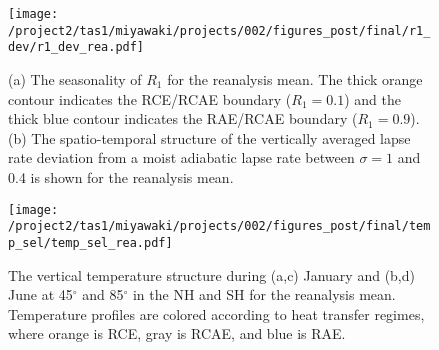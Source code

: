 \documentclass{ametsocV5}
\begin{document}

\begin{figure}[t]
  \noindent\texttt{[image: /project2/tas1/miyawaki/projects/002/figures\_post/final/r1\_dev/r1\_dev\_rea.pdf]}\\
  \caption{(a) The seasonality of $R_{1}$ for the reanalysis mean. The thick orange contour indicates the RCE/RCAE boundary ($R_1=0.1$) and the thick blue contour indicates the RAE/RCAE boundary ($R_1 = 0.9$). (b) The spatio-temporal structure of the vertically averaged lapse rate deviation from a moist adiabatic lapse rate between $\sigma=1$ and 0.4 is shown for the reanalysis mean.}
  \label{fig:rea-r1-dev}
\end{figure}

\begin{figure}[t]
  \noindent\texttt{[image: /project2/tas1/miyawaki/projects/002/figures\_post/final/temp\_sel/temp\_sel\_rea.pdf]}\\
  \caption{The vertical temperature structure during (a,c) January and (b,d) June at 45$^{\circ}$ and 85$^{\circ}$ in the NH and SH for the reanalysis mean. Temperature profiles are colored according to heat transfer regimes, where orange is RCE, gray is RCAE, and blue is RAE.}
  \label{fig:rea-temp-sel}
\end{figure}

\end{document}
